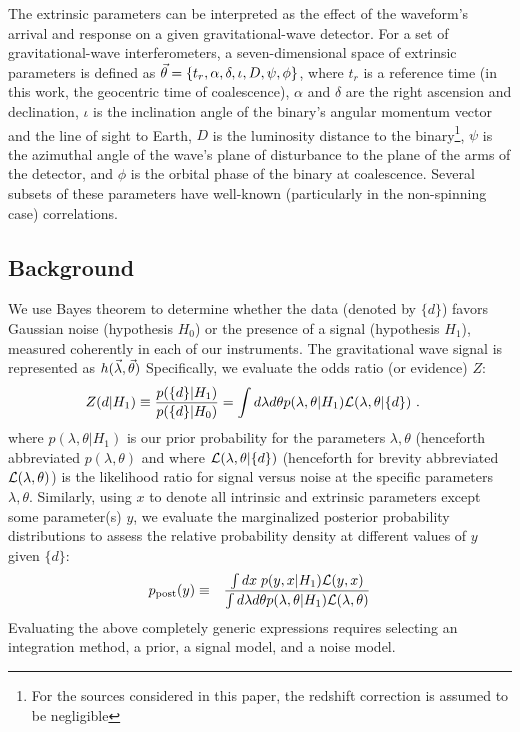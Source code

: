 The extrinsic parameters can be interpreted as the effect of the waveform's arrival and response on a given gravitational-wave detector. For a set of gravitational-wave interferometers, a seven-dimensional space of extrinsic parameters is defined as $\vec{\theta}=\{t_r,\alpha,\delta,\iota,D,\psi,\phi\}$, where $t_r$ is a reference time (in this work, the geocentric time of coalescence), $\alpha$ and $\delta$ are the right ascension and declination, $\iota$ is the inclination angle of the binary's angular momentum vector and the line of sight to Earth, $D$ is the luminosity distance to the binary\footnote{For the sources considered in this paper, the redshift correction is assumed to be negligible}, $\psi$ is the azimuthal angle of the wave's plane of disturbance to the plane of the arms of the detector, and $\phi$ is the orbital phase of the binary at coalescence. Several subsets of these parameters have well-known (particularly in the non-spinning case) correlations.

\subsection{Background}




We use Bayes theorem to determine whether the data (denoted by $\{d\}$) favors Gaussian noise (hypothesis
$H_0$) or the presence of a signal (hypothesis $H_1$), measured coherently in each of our instruments.  The
gravitational wave signal is represented as $h(\vec{\lambda},\vec{\theta})$  Specifically, we evaluate   the odds ratio (or evidence) $Z$:
\begin{align}
\label{eq:def:Z:Modified}
Z(d|H_1) &\equiv \frac{p(\{d\}|H_1)}{p(\{d\}|H_0)} 
  = \int d\lambda d\theta p(\lambda,\theta|H_1) {\cal L}(\lambda,\theta|\{d\})\ .
\end{align}
where  $p(\lambda,\theta|H_1)$ is our prior probability for the parameters $\lambda,\theta$ (henceforth abbreviated
$p(\lambda,\theta)$ and where ${\cal L}(\lambda,\theta|\{ d\})$ (henceforth for brevity abbreviated ${\cal L}(\lambda,\theta)$) is the likelihood ratio for signal versus noise at the specific parameters
$\lambda,\theta$.  
Similarly, using $x$ to denote all intrinsic and extrinsic parameters except some parameter(s) $y$, we evaluate the marginalized posterior
probability distributions to assess the relative probability density at different values of $y$ given $\{ d\}$:
\begin{eqnarray}
\label{eq:def:Posterior}
p_{\rm post}(y) &\equiv& \frac{\int dx \;  p(y,x|H_1) {\cal L}(y,x)}{ \int d\lambda d\theta p(\lambda,\theta|H_1) {\cal L}(\lambda,\theta)}
\end{eqnarray}
%
Evaluating the above completely generic expressions requires selecting an integration method, a prior,  a signal model, and a
noise model.  


